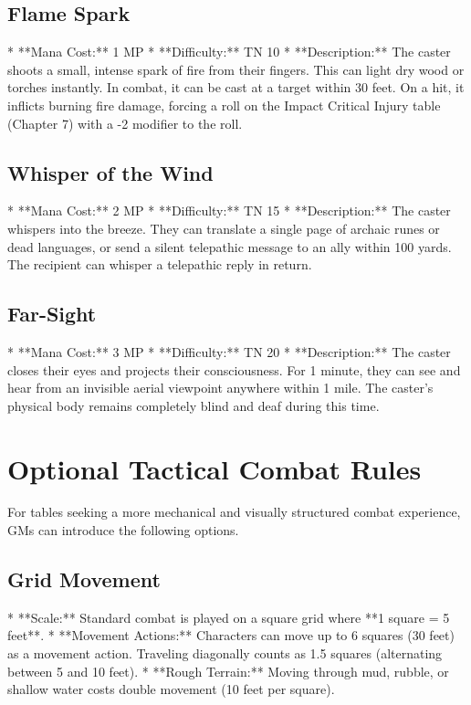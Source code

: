 \subsection{Flame Spark}
*   **Mana Cost:** 1 MP
*   **Difficulty:** TN 10
*   **Description:** The caster shoots a small, intense spark of fire from their fingers. This can light dry wood or torches instantly. In combat, it can be cast at a target within 30 feet. On a hit, it inflicts burning fire damage, forcing a roll on the Impact Critical Injury table (Chapter 7) with a -2 modifier to the roll.

\subsection{Whisper of the Wind}
*   **Mana Cost:** 2 MP
*   **Difficulty:** TN 15
*   **Description:** The caster whispers into the breeze. They can translate a single page of archaic runes or dead languages, or send a silent telepathic message to an ally within 100 yards. The recipient can whisper a telepathic reply in return.

\subsection{Far-Sight}
*   **Mana Cost:** 3 MP
*   **Difficulty:** TN 20
*   **Description:** The caster closes their eyes and projects their consciousness. For 1 minute, they can see and hear from an invisible aerial viewpoint anywhere within 1 mile. The caster's physical body remains completely blind and deaf during this time.

\section{Optional Tactical Combat Rules}

For tables seeking a more mechanical and visually structured combat experience, GMs can introduce the following options.

\subsection{Grid Movement}
*   **Scale:** Standard combat is played on a square grid where **1 square = 5 feet**.
*   **Movement Actions:** Characters can move up to 6 squares (30 feet) as a movement action. Traveling diagonally counts as 1.5 squares (alternating between 5 and 10 feet).
*   **Rough Terrain:** Moving through mud, rubble, or shallow water costs double movement (10 feet per square).

